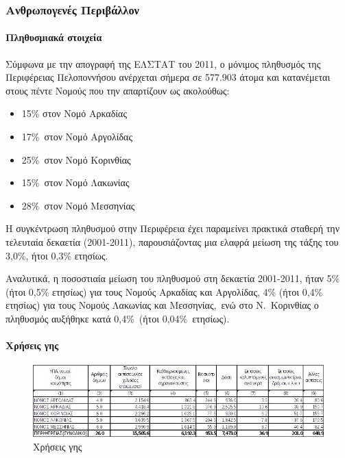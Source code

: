 \documentclass[12pt]{article}
\begin{document}
	\subsubsection{Ανθρωπογενές Περιβάλλον}
	
	\paragraph{Πληθυσμιακά στοιχεία}
	
	Σύμφωνα με την απογραφή της ΕΛΣΤΑΤ του 2011, ο μόνιμος πληθυσμός της Περιφέρειας Πελοποννήσου ανέρχεται σήμερα σε 577.903 άτομα και κατανέμεται στους πέντε Νομούς που την απαρτίζουν ως ακολούθως: 
	
	\begin{itemize}
		\item 15\% στον Νομό Αρκαδίας 
		\item 17\% στον Νομό Αργολίδας 
		\item 25\% στον Νομό Κορινθίας 
		\item 15\% στον Νομό Λακωνίας 
		\item 28\% στον Νομό Μεσσηνίας
	\end{itemize}
	
	Η συγκέντρωση πληθυσμού στην Περιφέρεια έχει παραμείνει πρακτικά σταθερή την τελευταία δεκαετία (2001-2011), παρουσιάζοντας μια ελαφρά μείωση της τάξης του 3,0\%, ήτοι 0,3\% ετησίως.
	
	Αναλυτικά, η ποσοστιαία μείωση του πληθυσμού στη δεκαετία 2001-2011, ήταν 5\% (ήτοι 0,5\% ετησίως) για τους Νομούς Αρκαδίας και Αργολίδας, 4\% (ήτοι 0,4\% ετησίως) για τους Νομούς Λακωνίας και Μεσσηνίας, ενώ στο Ν. Κορινθίας ο πληθυσμός αυξήθηκε κατά 0,4\% (ήτοι 0,04\% ετησίως).
	
	\paragraph{Χρήσεις γης}
	
	\begin{figure} [H]
		\begin{center}
			\includegraphics [scale = 0.80] {xriseis.jpg}
			\caption{Χρήσεις γης}
		\end{center}
	\end{figure}
	
\end{document}
